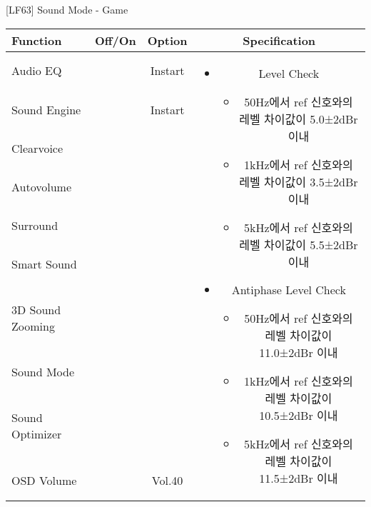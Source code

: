 \begin{frame}[t]{[LF63] Sound Mode - Game}
\begin{tiny}
\begin{tabular}{@{}lccc@{}}
\toprule
Function & Off/On & Option & Specification \\
\midrule
Audio EQ & \color{black}{Off} & Instart &
\multirow{10}{60mm}{
\begin{itemize}
\item Level Check
  \begin{itemize}
  \item 50Hz에서 ref 신호와의 레벨 차이값이 5.0±2dBr 이내
  \item 1kHz에서 ref 신호와의 레벨 차이값이 3.5±2dBr 이내
  \item 5kHz에서 ref 신호와의 레벨 차이값이 5.5±2dBr 이내
  \end{itemize}
\item Antiphase Level Check
  \begin{itemize}
  \item 50Hz에서 ref 신호와의 레벨 차이값이 11.0±2dBr 이내
  \item 1kHz에서 ref 신호와의 레벨 차이값이 10.5±2dBr 이내
  \item 5kHz에서 ref 신호와의 레벨 차이값이 11.5±2dBr 이내
  \end{itemize}
\end{itemize}
} \\
Sound Engine & \color{blue}{On} & Instart & \\
Clearvoice & \color{black}{Off} & & \\
Autovolume & \color{black}{Off} & & \\
Surround & \color{black}{Off} & & \\
Smart Sound & \color{black}{Off} & & \\
3D Sound Zooming & \color{black}{Off} & & \\
Sound Mode & \color{blue}{On} & \color{blue}{Game} & \\
Sound Optimizer & \color{black}{Off} & & \\
OSD Volume & \color{blue}{On} & Vol.40 & \\
\midrule
\end{tabular}
\end{tiny}

\end{frame}

